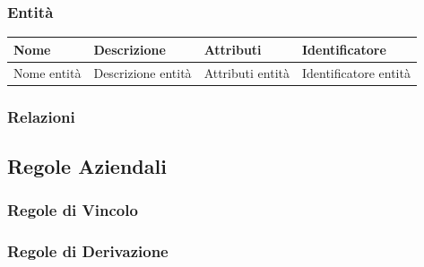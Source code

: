 		\subsubsection{Entità}
		\label{sec:entities}
		
			\begin{longtable}{| p{2.5cm} | p{4.5cm} | p{2cm} | p{2.5cm} |}
				\hline
				
					\textbf{Nome} & \textbf{Descrizione} & \textbf{Attributi} & \textbf{Identificatore} \\ \hline
					
					Nome entità & 
					Descrizione entità & 
					Attributi entità & 
					Identificatore entità
					\\
					
				\hline
			\end{longtable}

		\subsubsection{Relazioni}
		\label{sec:relationships}
	
	\subsection{Regole Aziendali}
	\label{sec:business_rules}
	
		\subsubsection{Regole di Vincolo}
		\subsubsection{Regole di Derivazione}

